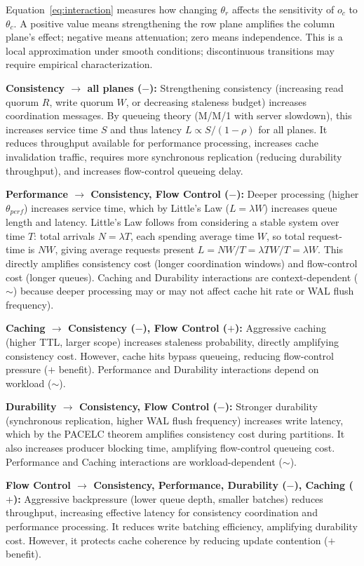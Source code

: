 \documentclass[conference]{IEEEtran}
\begin{document}
Equation~\eqref{eq:interaction} measures how changing $\theta_r$ affects the sensitivity of $o_c$ to $\theta_c$. A positive value means strengthening the row plane amplifies the column plane's effect; negative means attenuation; zero means independence. This is a local approximation under smooth conditions; discontinuous transitions may require empirical characterization.

\textbf{Consistency $\to$ all planes ($-$):} Strengthening consistency (increasing read quorum $R$, write quorum $W$, or decreasing staleness budget) increases coordination messages. By queueing theory (M/M/1 with server slowdown), this increases service time $S$ and thus latency $L \propto S/(1-\rho)$ for all planes. It reduces throughput available for performance processing, increases cache invalidation traffic, requires more synchronous replication (reducing durability throughput), and increases flow-control queueing delay.


\textbf{Performance $\to$ Consistency, Flow Control ($-$):} Deeper processing (higher $\theta_{perf}$) increases service time, which by Little's Law ($L = \lambda W$) increases queue length and latency. Little's Law follows from considering a stable system over time $T$: total arrivals $N = \lambda T$, each spending average time $W$, so total request-time is $NW$, giving average requests present $L = NW/T = \lambda TW/T = \lambda W$. This directly amplifies consistency cost (longer coordination windows) and flow-control cost (longer queues). Caching and Durability interactions are context-dependent ($\sim$) because deeper processing may or may not affect cache hit rate or WAL flush frequency).

\textbf{Caching $\to$ Consistency ($-$), Flow Control ($+$):} Aggressive caching (higher TTL, larger scope) increases staleness probability, directly amplifying consistency cost. However, cache hits bypass queueing, reducing flow-control pressure ($+$ benefit). Performance and Durability interactions depend on workload ($\sim$).

\textbf{Durability $\to$ Consistency, Flow Control ($-$):} Stronger durability (synchronous replication, higher WAL flush frequency) increases write latency, which by the PACELC theorem amplifies consistency cost during partitions. It also increases producer blocking time, amplifying flow-control queueing cost. Performance and Caching interactions are workload-dependent ($\sim$).

\textbf{Flow Control $\to$ Consistency, Performance, Durability ($-$), Caching ($+$):} Aggressive backpressure (lower queue depth, smaller batches) reduces throughput, increasing effective latency for consistency coordination and performance processing. It reduces write batching efficiency, amplifying durability cost. However, it protects cache coherence by reducing update contention ($+$ benefit).
\end{document}

